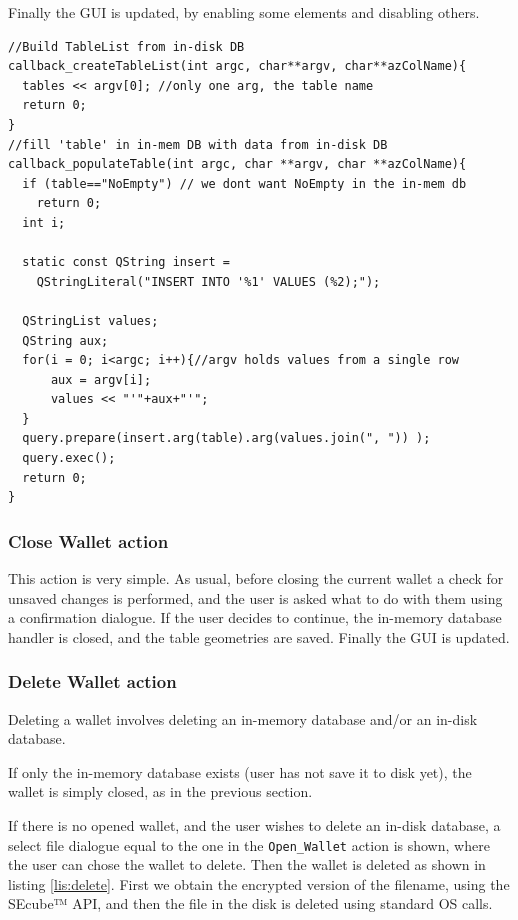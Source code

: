 Finally the GUI is updated, by enabling some elements and disabling others.

\begin{lstlisting}[style=customc, float=htb, caption={Callback functions for Sqlite3 SELECT}, label = {lis:callback}]
//Build TableList from in-disk DB
callback_createTableList(int argc, char**argv, char**azColName){ 
  tables << argv[0]; //only one arg, the table name
  return 0;
}
//fill 'table' in in-mem DB with data from in-disk DB
callback_populateTable(int argc, char **argv, char **azColName){ 
  if (table=="NoEmpty") // we dont want NoEmpty in the in-mem db
    return 0;
  int i;  

  static const QString insert = 
    QStringLiteral("INSERT INTO '%1' VALUES (%2);");
  
  QStringList values;
  QString aux;
  for(i = 0; i<argc; i++){//argv holds values from a single row 
      aux = argv[i];
      values << "'"+aux+"'"; 
  }
  query.prepare(insert.arg(table).arg(values.join(", ")) );
  query.exec();
  return 0;
}
\end{lstlisting}


\subsubsection*{Close Wallet action}

This action is very simple. As usual, before closing the current wallet a check for unsaved changes is performed, and the user is asked what to do with them using a confirmation dialogue. If the user decides to continue, the in-memory database handler is closed, and the table geometries are saved. Finally the GUI is updated.

\subsubsection*{Delete Wallet action}

Deleting a wallet involves deleting an in-memory database and/or an in-disk database. 

If only the in-memory database exists (user has not save it to disk yet), the wallet is simply closed, as in the previous section.

If there is no opened wallet, and the user wishes to delete an in-disk database, a select file dialogue equal to the one in the \texttt{Open\_Wallet} action is shown, where the user can chose the wallet to delete. Then the wallet is deleted as shown in listing \ref{lis:delete}. First we obtain the encrypted version of the filename, using the SEcube™ API, and then the file in the disk is deleted using standard OS calls. 

